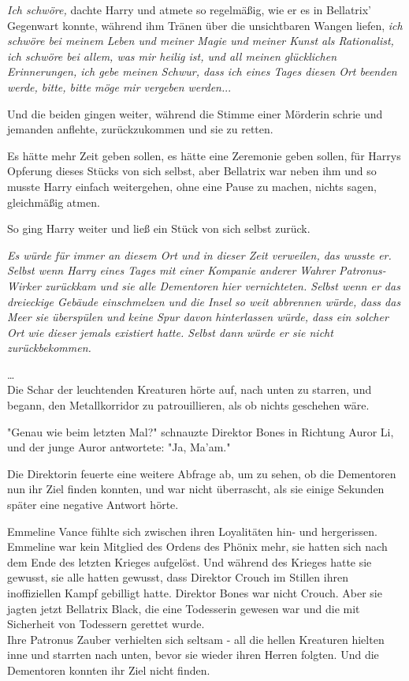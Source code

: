 {\emph{Ich schwöre,} dachte Harry und atmete so regelmäßig, wie er es in Bellatrix' Gegenwart konnte, während ihm Tränen über die unsichtbaren Wangen liefen, \emph{ich schwöre bei meinem Leben und meiner Magie und meiner Kunst als Rationalist, ich schwöre bei allem, was mir heilig ist, und all meinen glücklichen Erinnerungen, ich gebe meinen Schwur, dass ich eines Tages diesen Ort beenden werde, bitte, bitte möge mir vergeben werden.}..

Und die beiden gingen weiter, während die Stimme einer Mörderin schrie und jemanden anflehte, zurückzukommen und sie zu retten.

Es hätte mehr Zeit geben sollen, es hätte eine Zeremonie geben sollen, für Harrys Opferung dieses Stücks von sich selbst, aber Bellatrix war neben ihm und so musste Harry einfach weitergehen, ohne eine Pause zu machen, nichts sagen, gleichmäßig atmen.

So ging Harry weiter und ließ ein Stück von sich selbst zurück.

\emph{Es würde für immer an diesem Ort und in dieser Zeit verweilen, das wusste er. Selbst wenn Harry eines Tages mit einer Kompanie anderer Wahrer Patronus-Wirker zurückkam und sie alle Dementoren hier vernichteten. Selbst wenn er das dreieckige Gebäude einschmelzen und die Insel so weit abbrennen würde, dass das Meer sie überspülen und keine Spur davon hinterlassen würde, dass ein solcher Ort wie dieser jemals existiert hatte. Selbst dann würde er sie nicht zurückbekommen.}

…\\ Die Schar der leuchtenden Kreaturen hörte auf, nach unten zu starren, und begann, den Metallkorridor zu patrouillieren, als ob nichts geschehen wäre.

"Genau wie beim letzten Mal?" schnauzte Direktor Bones in Richtung Auror Li, und der junge Auror antwortete: "Ja, Ma'am."

Die Direktorin feuerte eine weitere Abfrage ab, um zu sehen, ob die Dementoren nun ihr Ziel finden konnten, und war nicht überrascht, als sie einige Sekunden später eine negative Antwort hörte.

Emmeline Vance fühlte sich zwischen ihren Loyalitäten hin- und hergerissen. Emmeline war kein Mitglied des Ordens des Phönix mehr, sie hatten sich nach dem Ende des letzten Krieges aufgelöst. Und während des Krieges hatte sie gewusst, sie alle hatten gewusst, dass Direktor Crouch im Stillen ihren inoffiziellen Kampf gebilligt hatte. Direktor Bones war nicht Crouch. Aber sie jagten jetzt Bellatrix Black, die eine Todesserin gewesen war und die mit Sicherheit von Todessern gerettet wurde.\\ Ihre Patronus Zauber verhielten sich seltsam - all die hellen Kreaturen hielten inne und starrten nach unten, bevor sie wieder ihren Herren folgten. Und die Dementoren konnten ihr Ziel nicht finden.

}
